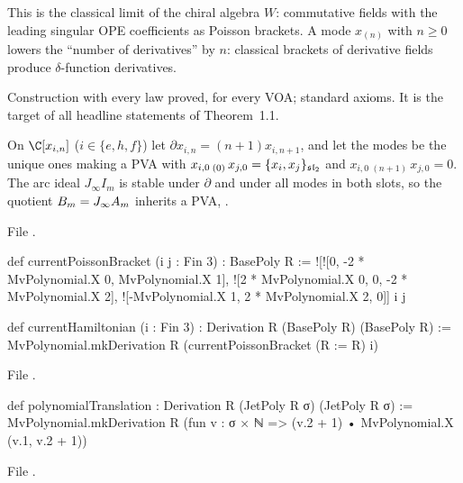\begin{physics}
This is the classical limit of the chiral algebra $W$: commutative fields with the leading singular OPE
coefficients as Poisson brackets. A mode $x_{(n)}$ with $n\ge0$ lowers the ``number of derivatives'' by $n$:
classical brackets of derivative fields produce $\delta$-function derivatives.
\end{physics}

\begin{status}
Construction with every law proved, for every VOA; standard axioms. It is the target of all headline
statements of Theorem~1.1.
\end{status}

\begin{definition}\label{l20:def:arcpva}
On $\C[x_{i,n}]$ ($i\in\{e,h,f\}$) let $\partial x_{i,n}=(n+1)x_{i,n+1}$, and let the modes be the unique ones
making a PVA with $x_{i,0}\,{}_{(0)}\,x_{j,0}=\{x_i,x_j\}_{\mathfrak{sl}_2}$ and $x_{i,0}\,{}_{(n+1)}\,x_{j,0}=0$. The arc
ideal $J_\infty I_m$ is stable under $\partial$ and under all modes in both slots, so the quotient
$B_m=J_\infty A_m$ inherits a PVA, .
\end{definition}
\noindent File .
\begin{leancode}
def currentPoissonBracket (i j : Fin 3) : BasePoly R :=
  ![![0, -2 * MvPolynomial.X 0, MvPolynomial.X 1],
    ![2 * MvPolynomial.X 0, 0, -2 * MvPolynomial.X 2],
    ![-MvPolynomial.X 1, 2 * MvPolynomial.X 2, 0]] i j

def currentHamiltonian (i : Fin 3) : Derivation R (BasePoly R) (BasePoly R) :=
  MvPolynomial.mkDerivation R (currentPoissonBracket (R := R) i)
\end{leancode}
\noindent File .
\begin{leancode}
def polynomialTranslation : Derivation R (JetPoly R σ) (JetPoly R σ) :=
  MvPolynomial.mkDerivation R (fun v : σ × ℕ =>
    (v.2 + 1) • MvPolynomial.X (v.1, v.2 + 1))
\end{leancode}
\noindent File .
